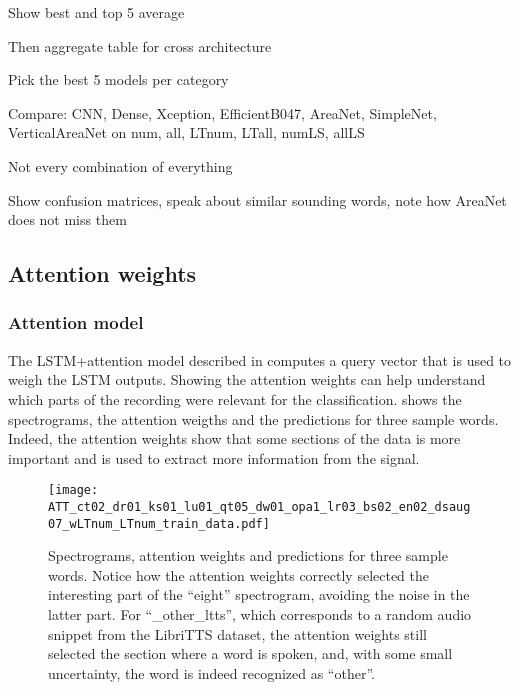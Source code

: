 Show best and top 5 average

Then aggregate table for cross architecture

Pick the best 5 models per category

Compare: CNN, Dense, Xception, EfficientB047, AreaNet, SimpleNet,
VerticalAreaNet on num, all, LTnum, LTall, numLS, allLS

Not every combination of everything

Show confusion matrices, speak about similar sounding words, note how AreaNet
does not miss them

\subsection{Attention weights}

\subsubsection{Attention model}


The LSTM+attention model described in  computes a query
vector that is used to weigh the LSTM outputs. Showing the attention weights
can help understand which parts of the recording were relevant for the
classification.
 shows the spectrograms, the attention
weigths and the predictions for three sample words.
Indeed, the attention weights show that some sections of the data is more important
and is used to extract more information from the signal.

\begin{figure*}[t!]
    \centering
    \texttt{[image: ATT\_ct02\_dr01\_ks01\_lu01\_qt05\_dw01\_opa1\_lr03\_bs02\_en02\_dsaug07\_wLTnum\_LTnum\_train\_data.pdf]}
    \caption{Spectrograms, attention weights and predictions for three sample words.
    Notice how the attention weights correctly selected the interesting part of
    the ``eight'' spectrogram, avoiding the noise in the latter part.
    For ``\_other\_ltts'', which corresponds to a random audio snippet from the LibriTTS
    dataset, the attention weights still selected the section where a word is spoken,
    and, with some small uncertainty, the word is indeed recognized as ``other''.}%
    \label{fig:attention_weights_standard}
\end{figure*}

